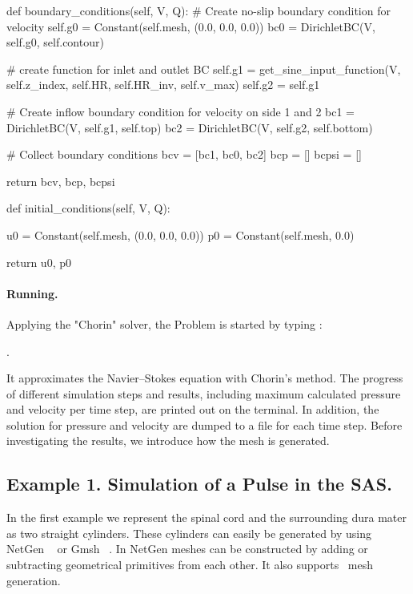 \begin{code}
def boundary_conditions(self, V, Q):
	# Create no-slip boundary condition for velocity
	self.g0 = Constant(self.mesh, (0.0, 0.0, 0.0))
	bc0 = DirichletBC(V, self.g0, self.contour)

	# create function for inlet and outlet BC
	self.g1 = get_sine_input_function(V, self.z_index, self.HR, self.HR_inv, self.v_max)
	self.g2 = self.g1 

	# Create inflow boundary condition for velocity on side 1 and 2
	bc1 = DirichletBC(V, self.g1, self.top)
	bc2 = DirichletBC(V, self.g2, self.bottom)	

	# Collect boundary conditions
	bcv = [bc1, bc0, bc2]
	bcp = []
	bcpsi = []

	return bcv, bcp, bcpsi

def initial_conditions(self, V, Q):

	u0 = Constant(self.mesh, (0.0, 0.0, 0.0))
	p0 = Constant(self.mesh, 0.0)

	return u0, p0
\end{code}


\paragraph{Running.}
Applying the "Chorin" solver, the Problem is started by typing :

. 

It approximates the Navier--Stokes equation with Chorin's method. The progress of different simulation steps and results, including maximum calculated pressure and velocity per time step, are printed out on the terminal. In addition, the solution for pressure and velocity are dumped to a file for each  time step. Before investigating the results, we introduce how the mesh is generated. 


\subsection{Example 1. Simulation of a Pulse in the SAS.} 
In the first example we represent the spinal cord and the surrounding dura mater as two straight cylinders.  These cylinders can easily be generated by using NetGen ~\cite{netgen} or Gmsh ~\cite{gmsh}.  In NetGen meshes can be constructed by adding or subtracting geometrical primitives from each other. It also supports \dolfin\ mesh generation. 

